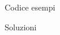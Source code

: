 \begin{frame}{Codice esempi}

    \begin{exampleblock}{Soluzioni}
      
    \end{exampleblock}

\end{frame}
